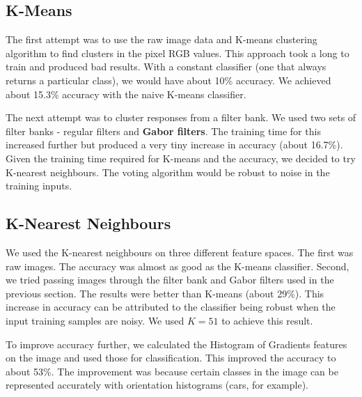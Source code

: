 \documentclass{article} %
\begin{document}
\subsection{K-Means} %
The first attempt was to use the raw image data and K-means clustering algorithm to find clusters in the pixel RGB values. This approach took a long to train and produced bad results. With a constant classifier (one that always returns a particular class), we would have about 10\% accuracy. We achieved about 15.3\% accuracy with the naive K-means classifier. %

        The next attempt was to cluster responses from a filter bank. We used two sets of filter banks - regular filters and \textbf{Gabor filters}. The training time for this increased further but produced a very tiny increase in accuracy (about 16.7\%). Given the training time required for K-means and the accuracy, we decided to try K-nearest neighbours. The voting algorithm would be robust to noise in the training inputs.

\subsection{K-Nearest Neighbours} %
We used the K-nearest neighbours on three different feature spaces. The first was raw images. The accuracy was almost as good as the K-means classifier. Second, we tried passing images through the filter bank and Gabor filters used in the previous section. The results were better than K-means (about 29\%). This increase in accuracy can be attributed to the classifier being robust when the input training samples are noisy. We used $K=51$ to achieve this result.

        To improve accuracy further, we calculated the Histogram of Gradients features on the image and used those for classification. This improved the accuracy to about 53\%. The improvement was because certain classes in the image can be represented accurately with orientation histograms (cars, for example).
\end{document}
